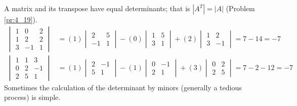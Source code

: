\documentclass[../main.tex]{subfiles}
\begin{document}
\begin{example} \label{ex:4_4}
  A matrix and its transpose have equal determinants; that is \(|A^T| = |A|\) (Problem \ref{pr:4_19}).
  \begin{equation*}
    \begin{aligned}
      \begin{vmatrix}
        1 & 0 & 2 \\
        1 & 2 & 2 \\
        3 & -1 & 1 
      \end{vmatrix}
      &=(1)
      \begin{vmatrix}
        2 & 5 \\
        -1 & 1 
      \end{vmatrix}
      -(0)
      \begin{vmatrix}
        1 & 5 \\
        3 & 1 
      \end{vmatrix}
      +(2)
      \begin{vmatrix}
        1 & 2 \\
        3 & -1 
      \end{vmatrix}
      = 7-14 = -7
      \\
      \begin{vmatrix}
        1 & 1 & 3 \\
        0 & 2 & -1 \\
        2 & 5 & 1 
      \end{vmatrix}
      &=(1)
      \begin{vmatrix}
        2 & -1 \\
        5 & 1 
      \end{vmatrix}
      -(1)
      \begin{vmatrix}
        0 & -1 \\
        2 & 1 
      \end{vmatrix}
      +(3)
      \begin{vmatrix}
        0 & 2 \\
        2 & 5 
      \end{vmatrix}
      = 7-2-12 = -7
    \end{aligned}
  \end{equation*}
  Sometimes the calculation of the determinant by minors (generally a tedious process) is simple.
\end{example}
\end{document}
